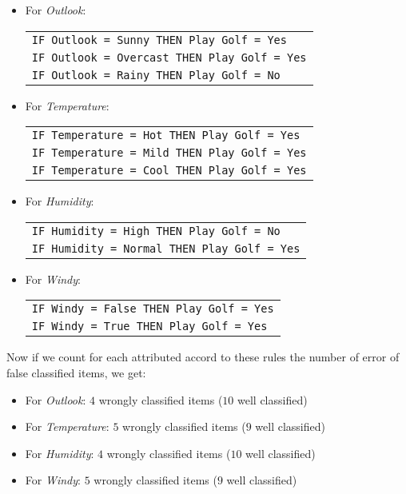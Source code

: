 	\begin{itemize}
		\item For \textit{Outlook}:
		\begin{table}[H]
			\centering
			\begin{tabular}{l}
			\texttt{IF Outlook = Sunny THEN Play Golf = Yes}\\
			\texttt{IF Outlook = Overcast THEN Play Golf = Yes}\\
			\texttt{IF Outlook = Rainy THEN Play Golf = No}\\
			\end{tabular}
		\end{table}
	
		\item For \textit{Temperature}:
		\begin{table}[H]
			\centering
			\begin{tabular}{l}
			\texttt{IF Temperature = Hot THEN Play Golf = Yes}\\
			\texttt{IF Temperature = Mild THEN Play Golf = Yes}\\
			\texttt{IF Temperature = Cool THEN Play Golf = Yes}\\
			\end{tabular}
		\end{table}
	
		\item For \textit{Humidity}:
		\begin{table}[H]
			\centering
			\begin{tabular}{l}
			\texttt{IF Humidity = High THEN Play Golf = No}\\
			\texttt{IF Humidity = Normal THEN Play Golf = Yes}\\
			\end{tabular}
		\end{table}
	
		\item For \textit{Windy}:
		\begin{table}[H]
			\centering
			\begin{tabular}{l}
			\texttt{IF Windy = False THEN Play Golf = Yes}\\
			\texttt{IF Windy = True THEN Play Golf = Yes}\\
			\end{tabular}
		\end{table}
	\end{itemize}
	Now if we count for each attributed accord to these rules the number of error of false classified items, we get:
	\begin{itemize}
		\item For \textit{Outlook}: $4$ wrongly classified items ($10$ well classified)
	
		\item For \textit{Temperature}: $5$ wrongly classified items ($9$ well classified)
	
		\item For \textit{Humidity}: $4$ wrongly classified items ($10$ well classified)
	
		\item For \textit{Windy}: $5$ wrongly classified items ($9$ well classified)
	\end{itemize}
